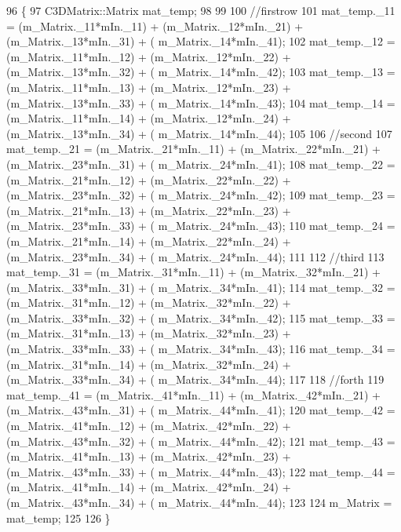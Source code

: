 \begin{DoxyCode}
96 \{
97     C3DMatrix::Matrix mat\_temp;
98 
99 
100   \textcolor{comment}{//firstrow}
101   mat\_temp._11 = (m_Matrix._11*mIn.\_11) + (m_Matrix._12*mIn.\_21) + (m_Matrix._13*mIn.\_31) + (
      m_Matrix._14*mIn.\_41);
102   mat\_temp._12 = (m_Matrix._11*mIn.\_12) + (m_Matrix._12*mIn.\_22) + (m_Matrix._13*mIn.\_32) + (
      m_Matrix._14*mIn.\_42);
103   mat\_temp._13 = (m_Matrix._11*mIn.\_13) + (m_Matrix._12*mIn.\_23) + (m_Matrix._13*mIn.\_33) + (
      m_Matrix._14*mIn.\_43);
104   mat\_temp._14 = (m_Matrix._11*mIn.\_14) + (m_Matrix._12*mIn.\_24) + (m_Matrix._13*mIn.\_34) + (
      m_Matrix._14*mIn.\_44);
105 
106   \textcolor{comment}{//second}
107   mat\_temp._21 = (m_Matrix._21*mIn.\_11) + (m_Matrix._22*mIn.\_21) + (m_Matrix._23*mIn.\_31) + (
      m_Matrix._24*mIn.\_41);
108   mat\_temp._22 = (m_Matrix._21*mIn.\_12) + (m_Matrix._22*mIn.\_22) + (m_Matrix._23*mIn.\_32) + (
      m_Matrix._24*mIn.\_42);
109   mat\_temp._23 = (m_Matrix._21*mIn.\_13) + (m_Matrix._22*mIn.\_23) + (m_Matrix._23*mIn.\_33) + (
      m_Matrix._24*mIn.\_43);
110   mat\_temp._24 = (m_Matrix._21*mIn.\_14) + (m_Matrix._22*mIn.\_24) + (m_Matrix._23*mIn.\_34) + (
      m_Matrix._24*mIn.\_44);
111 
112   \textcolor{comment}{//third}
113   mat\_temp._31 = (m_Matrix._31*mIn.\_11) + (m_Matrix._32*mIn.\_21) + (m_Matrix._33*mIn.\_31) + (
      m_Matrix._34*mIn.\_41);
114   mat\_temp._32 = (m_Matrix._31*mIn.\_12) + (m_Matrix._32*mIn.\_22) + (m_Matrix._33*mIn.\_32) + (
      m_Matrix._34*mIn.\_42);
115   mat\_temp._33 = (m_Matrix._31*mIn.\_13) + (m_Matrix._32*mIn.\_23) + (m_Matrix._33*mIn.\_33) + (
      m_Matrix._34*mIn.\_43);
116   mat\_temp._34 = (m_Matrix._31*mIn.\_14) + (m_Matrix._32*mIn.\_24) + (m_Matrix._33*mIn.\_34) + (
      m_Matrix._34*mIn.\_44);
117 
118   \textcolor{comment}{//forth}
119   mat\_temp._41 = (m_Matrix._41*mIn.\_11) + (m_Matrix._42*mIn.\_21) + (m_Matrix._43*mIn.\_31) + (
      m_Matrix._44*mIn.\_41);
120   mat\_temp._42 = (m_Matrix._41*mIn.\_12) + (m_Matrix._42*mIn.\_22) + (m_Matrix._43*mIn.\_32) + (
      m_Matrix._44*mIn.\_42);
121   mat\_temp._43 = (m_Matrix._41*mIn.\_13) + (m_Matrix._42*mIn.\_23) + (m_Matrix._43*mIn.\_33) + (
      m_Matrix._44*mIn.\_43);
122   mat\_temp._44 = (m_Matrix._41*mIn.\_14) + (m_Matrix._42*mIn.\_24) + (m_Matrix._43*mIn.\_34) + (
      m_Matrix._44*mIn.\_44);
123 
124   m_Matrix = mat\_temp;
125 
126 \}
\end{DoxyCode}


